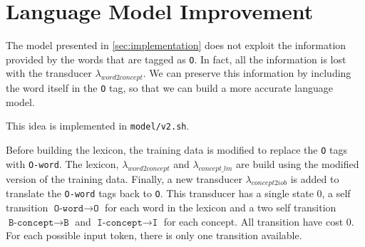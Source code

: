 \section{Language Model Improvement}

The model presented in \cref{sec:implementation} does not exploit the information provided by the words that are tagged as \texttt{O}.
In fact, all the information is lost with the transducer $\lambda_{word2concept}$.
We can preserve this information by including the word itself in the \texttt{O} tag, so that we can build a more accurate language model.

This idea is implemented in \texttt{model/v2.sh}.

Before building the lexicon, the training data is modified to replace the \texttt{O} tags with \texttt{O-word}.
The lexicon, $\lambda_{word2concept}$ and $\lambda_{concept\_lm}$ are build using the modified version of the training data.
Finally, a new transducer $\lambda_{concept2iob}$ is added to translate the \texttt{O-word} tags back to \texttt{O}.
This transducer has a single state $0$, a self transition $\texttt{O-word} \rightarrow \texttt{O}$ for each word in the lexicon and a two self transition $\texttt{B-concept} \rightarrow \texttt{B}$ and $\texttt{I-concept} \rightarrow \texttt{I}$ for each concept.
All transition have cost $0$.
For each possible input token, there is only one transition available.
